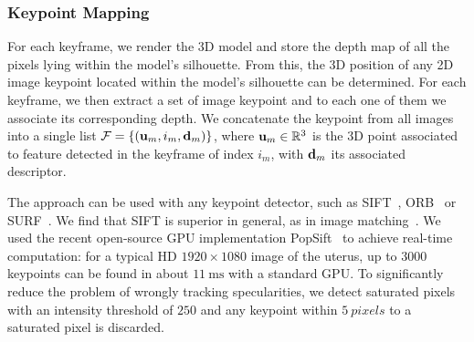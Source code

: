 \subsubsection{Keypoint Mapping}
\label{sec:preparing}
For each keyframe, we render the 3D model and store the depth map of all the pixels lying within the model's silhouette. %
From this, the 3D position  of any 2D image keypoint located within the model's silhouette can be determined.
For each keyframe, we then extract a set of image keypoint and to each one of them we associate its corresponding depth. 
We concatenate the keypoint from all images into a single list $\mathcal{F}=\{(\mathbf{u}_{m},i_{m},\mathbf{d}_{m})\}$, where $\mathbf{u}_{m} \in \mathbb{R}^3$
is the 3D point associated to feature detected in the keyframe of index $i_{m}$, with $\mathbf{d}_{m}$ its associated descriptor.

The approach can be used with any keypoint detector, such as SIFT~\cite{Lowe:2004:DIF:993451.996342}, ORB~\cite{orbslam_laparo} or SURF~\cite{SURF}. We find that SIFT is superior in general, as in image matching~\cite{Tuytelaars2007}. We used the recent open-source GPU implementation PopSift~\cite{Griwodz2018Popsift} to achieve real-time computation: for a typical HD $1920\times1080$ image of the uterus, up to $3000$ keypoints can be found in about $\SI{11}{\milli\second}$ with a standard GPU.
To significantly reduce the problem of wrongly tracking specularities, we detect saturated pixels with an intensity threshold of $250$ and any keypoint within $\SI{5}{pixels}$ to a saturated pixel is discarded.  

